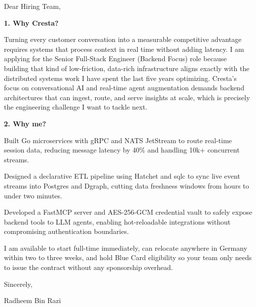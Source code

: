 \documentclass[11pt,a4paper]{coverletter}
\begin{document}

\opening{Dear Hiring Team,}

\vspace{8pt}\noindent\textbf{1. Why Cresta?}\par\vspace{3pt}

Turning every customer conversation into a measurable competitive advantage requires systems that process context in real time without adding latency. I am applying for the Senior Full-Stack Engineer (Backend Focus) role because building that kind of low-friction, data-rich infrastructure aligns exactly with the distributed systems work I have spent the last five years optimizing. Cresta’s focus on conversational AI and real-time agent augmentation demands backend architectures that can ingest, route, and serve insights at scale, which is precisely the engineering challenge I want to tackle next.

\vspace{8pt}\noindent\textbf{2. Why me?}\par\vspace{3pt}

\bullets

  \item Built Go microservices with gRPC and NATS JetStream to route real-time session data, reducing message latency by 40\% and handling 10k+ concurrent streams.

  \item Designed a declarative ETL pipeline using Hatchet and sqlc to sync live event streams into Postgres and Dgraph, cutting data freshness windows from hours to under two minutes.

  \item Developed a FastMCP server and AES-256-GCM credential vault to safely expose backend tools to LLM agents, enabling hot-reloadable integrations without compromising authentication boundaries.

\bulletsend

I am available to start full-time immediately, can relocate anywhere in Germany within two to three weeks, and hold Blue Card eligibility so your team only needs to issue the contract without any sponsorship overhead.

\closing{Sincerely,}{Radheem Bin Razi}

\clearpage
{}

\end{document}
